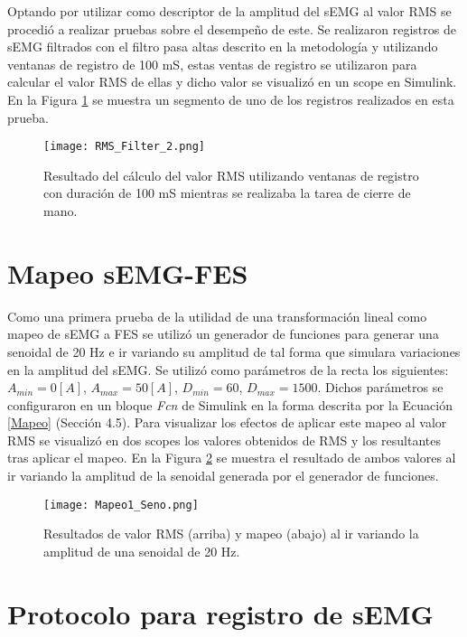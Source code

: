 Optando por utilizar como descriptor de la amplitud del sEMG al valor RMS se procedió a realizar pruebas sobre el desempeño de este. Se realizaron registros de sEMG filtrados con el filtro pasa altas descrito en la metodología y utilizando ventanas de registro de 100 mS, estas ventas de registro se utilizaron para calcular el valor RMS de ellas y dicho valor se visualizó en un scope en Simulink. En la Figura \ref{Figura: RMS_Filter} se muestra un segmento de uno de los registros realizados en esta prueba.

\begin{figure}[htbp]
	\centering
	\texttt{[image: RMS\_Filter\_2.png]}
	\caption{Resultado del cálculo del valor RMS utilizando ventanas de registro con duración de 100 mS mientras se realizaba la tarea de cierre de mano.}
	\label{Figura: RMS_Filter}
\end{figure}

\newpage
\section{Mapeo sEMG-FES}
Como una primera prueba de la utilidad de una transformación lineal como mapeo de sEMG a FES se utilizó un generador de funciones para generar una senoidal de  20 Hz e ir variando su amplitud de tal forma que simulara variaciones en la amplitud del sEMG. Se utilizó como parámetros de la recta los siguientes: $A_{min}=0[A]$, $A_{max}=50[A]$, $D_{min}=60$, $D_{max}=1500$. Dichos parámetros se configuraron en un bloque \emph{Fcn} de Simulink en la forma descrita por la Ecuación \ref{Mapeo} (Sección 4.5). Para visualizar los efectos de aplicar este mapeo al valor RMS se visualizó en dos scopes los valores obtenidos de RMS y los resultantes tras aplicar el mapeo. En la Figura \ref{Figura: Map1_Sen} se muestra el resultado de ambos valores al ir variando la amplitud de la senoidal generada por el generador de funciones.

\begin{figure}
	\centering
	\texttt{[image: Mapeo1\_Seno.png]}
	\caption{Resultados de valor RMS (arriba) y mapeo (abajo) al ir variando la amplitud de una senoidal de 20 Hz.}
	\label{Figura: Map1_Sen}
\end{figure}

\newpage
\section{Protocolo para registro de sEMG}

